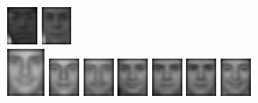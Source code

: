 \begin{figure}[hbt]
  \includegraphics[width=0.08\textwidth]{../results/L_rez/incorrect95/1/9.jpg}
  \includegraphics[width=0.08\textwidth]{../results/L_rez/incorrect95/1/10.jpg} \\
  \vspace{4pt}
  \includegraphics[width=0.1\textwidth]{../results/L_rez/incorrect95/2/testImg.jpg} \vline
  \hspace{2pt}
  \includegraphics[width=0.08\textwidth]{../results/L_rez/incorrect95/2/1.jpg}
  \includegraphics[width=0.08\textwidth]{../results/L_rez/incorrect95/2/2.jpg}
  \includegraphics[width=0.08\textwidth]{../results/L_rez/incorrect95/2/3.jpg}
  \includegraphics[width=0.08\textwidth]{../results/L_rez/incorrect95/2/4.jpg}
  \includegraphics[width=0.08\textwidth]{../results/L_rez/incorrect95/2/5.jpg}
  \includegraphics[width=0.08\textwidth]{../results/L_rez/incorrect95/2/6.jpg}

\end{figure}
